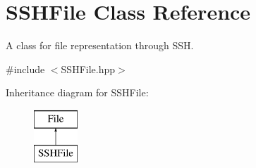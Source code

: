 \hypertarget{classSSHFile}{
\section{SSHFile Class Reference}
\label{classSSHFile}
}


A class for file representation through SSH.  




{\ttfamily \#include $<$SSHFile.hpp$>$}

Inheritance diagram for SSHFile:\begin{figure}[H]
\begin{center}
\leavevmode
\includegraphics[height=2.000000cm]{classSSHFile}
\end{center}
\end{figure}
